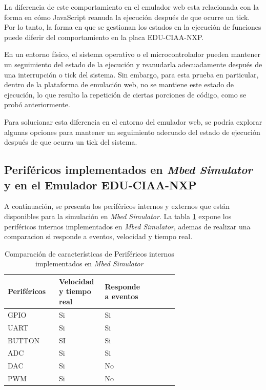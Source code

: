 La diferencia de este comportamiento en el emulador web esta relacionada con la forma en cómo JavaScript reanuda la ejecución después de que ocurre un tick. Por lo tanto, la forma en que se gestionan los estados en la ejecución de funciones puede diferir del comportamiento en la placa EDU-CIAA-NXP.

En un entorno físico, el sistema operativo o el microcontrolador pueden mantener un seguimiento del estado de la ejecución y reanudarla adecuadamente después de una interrupción o tick del sistema. Sin embargo, para esta prueba en particular, dentro de la plataforma de emulación web, no se mantiene este estado de ejecución, lo que resulto la repetición de ciertas porciones de código, como se probó anteriormente.

Para solucionar esta diferencia en el entorno del emulador web, se podría explorar algunas opciones para mantener un seguimiento adecuado del estado de ejecución después de que ocurra un tick del sistema.

\subsection{Periféricos implementados en \textit{Mbed Simulator} y en el Emulador EDU-CIAA-NXP}

A continuación, se presenta los periféricos internos y externos que están disponibles para la simulación en \textit{Mbed Simulator}. La tabla \ref{tab:perifericosInternosMBED} expone los  periféricos internos implementados en \textit{Mbed Simulator}, ademas de realizar una comparacion  si responde a eventos, velocidad y tiempo real.

\begin{table}[h]
\centering
\caption[Comparación de características de periféricos internos implementados en \textit{Mbed Simulator}]{Comparación de características de Periféricos internos implementados en \textit{Mbed Simulator}}
\begin{tabular}{p{0.24\linewidth} p{0.14\linewidth}  p{0.14\linewidth}  p{0.14\linewidth}}
\toprule
\textbf{Periféricos} 
& \textbf{Velocidad y tiempo real}
& \textbf{Responde a eventos}
\\
\midrule
GPIO & Si & Si  \\
UART & Si & Si \\
BUTTON & SI & Si \\
ADC & Si & Si \\
DAC & Si & No \\
PWM & Si & No \\ 
\bottomrule
\hline
\end{tabular}
\label{tab:perifericosInternosMBED}
\end{table}

